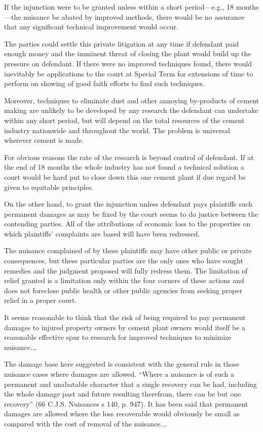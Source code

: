 If the injunction were to be granted unless within a short period---e.g., 18
months---the nuisance be abated by improved methods, there would be no assurance
that any significant technical improvement would occur.

The parties could settle this private litigation at any time if defendant paid
enough money and the imminent threat of closing the plant would build up the
pressure on defendant. If there were no improved techniques found, there would
inevitably be applications to the court at Special Term for extensions of time
to perform on showing of good faith efforts to find such techniques.

Moreover, techniques to eliminate dust and other annoying by-products of cement
making are unlikely to be developed by any research the defendant can undertake
within any short period, but will depend on the total resources of the cement
industry nationwide and throughout the world. The problem is universal wherever
cement is made.

For obvious reasons the rate of the research is beyond control of defendant. If
at the end of 18 months the whole industry has not found a technical solution a
court would be hard put to close down this one cement plant if due regard be
given to equitable principles.

On the other hand, to grant the injunction unless defendant pays plaintiffs such
permanent damages as may be fixed by the court seems to do justice between the
contending parties. All of the attributions of economic loss to the properties
on which plaintiffs' complaints are based will have been redressed.

The nuisance complained of by these plaintiffs may have other public or private
consequences, but these particular parties are the only ones who have sought
remedies and the judgment proposed will fully redress them. The limitation of
relief granted is a limitation only within the four corners of these actions and
does not foreclose public health or other public agencies from seeking proper
relief in a proper court.

It seems reasonable to think that the risk of being required to pay permanent
damages to injured property owners by cement plant owners would itself be a
reasonable effective spur to research for improved techniques to minimize
nuisance.\ldots 

The damage base here suggested is consistent with the general rule in those
nuisance cases where damages are allowed. ``Where a nuisance is of such a
permanent and unabatable character that a single recovery can be had, including
the whole damage past and future resulting therefrom, there can be but one
recovery'' (66 C.J.S. Nuisances s 140, p. 947). It has been said that permanent
damages are allowed where the loss recoverable would obviously be small as
compared with the cost of removal of the nuisance.\ldots

